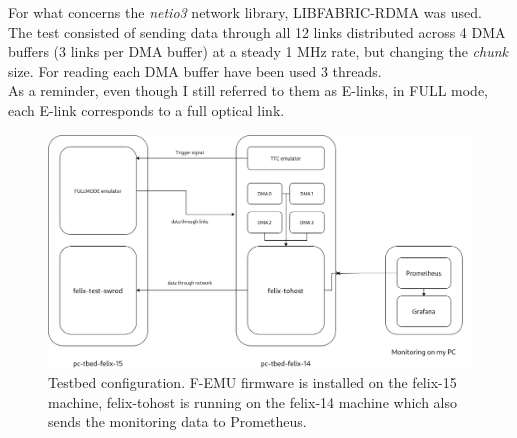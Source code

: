 For what concerns the \emph{netio3} network library, LIBFABRIC-RDMA was used.\\
The test consisted of sending data through all 12 links distributed across 4 \acs{DMA} buffers (3 links per \acs{DMA} buffer) at a steady 1 MHz rate, but changing the \emph{chunk} size. For reading each DMA buffer have been used 3 threads.\\
As a reminder, even though I still referred to them as \acs{E-link}s, in FULL mode, each \acs{E-link} corresponds to a full optical link.

\begin{figure}[htbp]
\centering
\includegraphics[width=\textwidth]{images/results/tohost-tbed-setup.png}
\caption[Testbed configuration]{Testbed configuration. F-EMU firmware is installed on the felix-15 machine, felix-tohost is running on the felix-14 machine which also sends the monitoring data to Prometheus.}
\label{fig:tbed-setup}
\end{figure}

